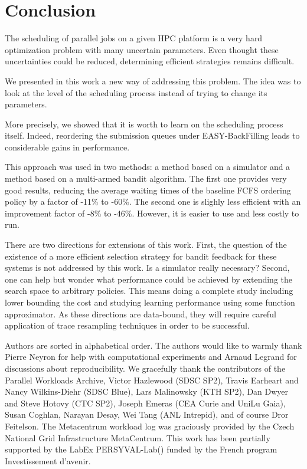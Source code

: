 \documentclass[sigconf,anonymous]{acmart}
\begin{document}
\section{Conclusion}
\label{sec:ccl}

The scheduling of parallel jobs on a given HPC platform is a very hard
optimization problem with many uncertain parameters. Even thought these
uncertainties could be reduced, determining efficient strategies remains
difficult.

We presented in this work a new way of addressing this problem.  The idea was
to look at the level of the scheduling process instead of trying to change its
parameters.

More precisely, we showed that it is worth to learn on the scheduling process
itself. Indeed, reordering the submission queues under EASY-BackFilling leads
to considerable gains in performance.

This approach was used in two methods: a method based on a simulator and a
method based on a multi-armed bandit algorithm. The first one provides very good results,
reducing the average waiting times of the baseline FCFS ordering policy by a
factor of -11\% to -60\%. The second one is
slighly less efficient with an improvement factor of -8\% to
-46\%. However, it is easier to use and less costly to run.

There are two directions for extensions of this work.  First, the question of
the existence of a more efficient selection strategy for bandit feedback for
these systems is not addressed by this work. Is a simulator really necessary?
Second, one can help but wonder what performance could be achieved by extending
the search space to arbitrary policies. This means doing a complete study
including lower bounding the cost and studying learning performance using some
function approximator.
As these directions are data-bound, they will require careful application of
trace resampling techniques in order to be successful.

\begin{acks}

Authors are sorted in alphabetical order. The authors would like to warmly
thank Pierre Neyron for help with computational experiments and Arnaud Legrand
for discussions about reproducibility. We gracefully thank the contributors of
the Parallel Workloads Archive, Victor Hazlewood (SDSC SP2), Travis Earheart
and Nancy Wilkins-Diehr (SDSC Blue), Lars Malinowsky (KTH SP2), Dan Dwyer and
Steve Hotovy (CTC SP2), Joseph Emeras (CEA Curie and UniLu Gaia), Susan
Coghlan, Narayan Desay, Wei Tang (ANL Intrepid), and of course Dror Feitelson.
The Metacentrum workload log was graciously provided by the Czech National Grid
Infrastructure MetaCentrum. This work has been partially supported by the LabEx
PERSYVAL-Lab() funded by
the French program Investissement d'avenir.
\end{acks}
\end{document}
